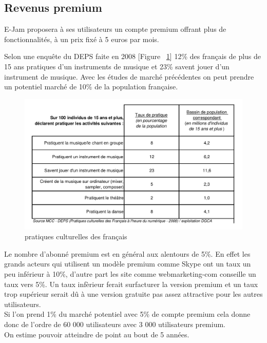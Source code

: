 \documentclass[a4,12pt]{article}
\begin{document}
\subsection{Revenus premium}

E-Jam proposera à ses utilisateurs un compte premium offrant plus de fonctionnalités,
à un prix fixé à 5 euros par mois.

Selon une enquête du DEPS faite en 2008 [Figure ~\ref{fig:pratiques}]
12\% des français de plus de 15 ans pratiques d'un instruments de musique et 23\% savent
jouer d'un instrument de musique. Avec les études de marché précédentes on peut prendre un potentiel marché de 10\% de la population française.\\

\begin{figure}[!h]
    \centering
    \includegraphics[width=400pt]{pratiques_culturelles_des_francais.png}
    \caption{pratiques culturelles des français}
    \label{fig:pratiques}
\end{figure}

Le nombre d'abonné premium est en général aux alentours de 5\%. En effet les grands acteurs qui utilisent un modèle premium comme Skype ont un taux un peu inférieur à 10\%, d'autre part les site comme webmarketing-com conseille un taux vers 5\%. Un taux infèrieur ferait surfacturer la version premium et un taux trop supérieur serait dû à une version gratuite pas assez attractive pour les autres utilisateurs.\\

Si l'on prend 1\% du marché potentiel avec 5\% de compte premium cela donne donc de l'ordre de 60 000 utilisateurs avec 3 000 utilisateurs premium.\\
On estime pouvoir atteindre de point au bout de 5 années.\\
\end{document}
